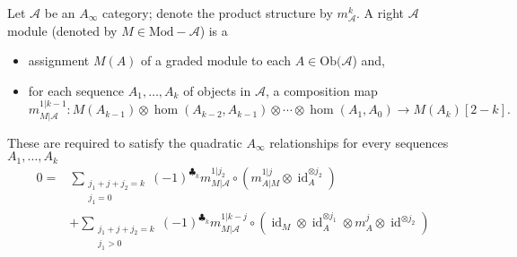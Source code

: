 
 
 
Let $\mathcal A$ be  an \emph{$A_\infty$} category; denote the product structure by $m^k_\mathcal A$. A right $\mathcal A$ module (denoted by $M\in \text{Mod}-\mathcal A$) is a 
\begin{itemize}
    \item assignment $M(A)$ of a graded module to each $A\in \text{Ob}(\mathcal A$) and,
    \item for each sequence $A_1, \ldots, A_k$ of objects in $\mathcal A$, a composition map 
    \[
        m^{1|{k-1}}_{M|\mathcal A}:M(A_{k-1})\otimes \hom(A_{k-2}, A_{k-1})\otimes \cdots \otimes \hom(A_1, A_0)\to M(A_k)[2-k].
    \]
\end{itemize}
These are required to satisfy the quadratic  $A_\infty$ relationships for every sequences $A_1, \ldots, A_k$
\begin{align*}
    0=&\sum_{\substack{ j_1+j+j_2=k\\j_1=0 }} (-1)^{\clubsuit_k} m_{M|\mathcal A}^{1|j_2} \circ (m_{A|M}^{1|j}\otimes  \operatorname{id}_A^{\otimes j_2})\\
    &+\sum_{\substack{ j_1+j+j_2=k\\j_1>0 }} (-1)^{\clubsuit_k} m_{M|{\mathcal A}}^{1|k-j}\circ ( \operatorname{id}_M\otimes  \operatorname{id}_A^{\otimes j_1}\otimes m^{j}_A \otimes \operatorname{id}^{\otimes j_2})
\end{align*}

 